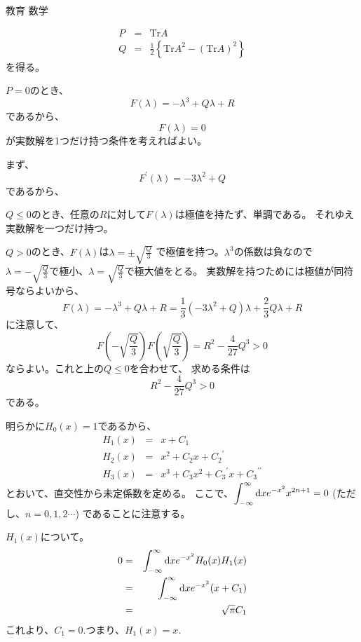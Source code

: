 \documentclass[fleqn]{jbook}
\begin{document}
\begin{answer}{教育 数学}{}
\begin{subanswers}
\begin{subsubanswers}
\begin{eqnarray*}
P &=& \mbox{Tr} A \\
Q &=& \frac{1}{2} \left\{ \mbox{Tr} A^2 - \left( \mbox{Tr} A \right)^2 \right\}
\end{eqnarray*}
を得る。

\SubSubAnswer
$P=0$のとき、
\[F(\lambda) = -\lambda^3 + Q \lambda + R\]
であるから、
\[F(\lambda)=0\]
が実数解を1つだけ持つ条件を考えればよい。

まず、
\[ F^\prime (\lambda) = - 3 \lambda^2 + Q\]
であるから、

$Q \leq 0$のとき、任意の$R$に対して$F(\lambda)$は極値を持たず、単調である。
それゆえ実数解を一つだけ持つ。

$Q>0$のとき、$F(\lambda)$は$\lambda= \pm \displaystyle{\sqrt{\frac{Q}{3}}}$
で極値を持つ。$\lambda^3$の係数は負なので
$\lambda = -\displaystyle{\sqrt{\frac{Q}{3}}}$で極小、$\lambda = 
\displaystyle{\sqrt{\frac{Q}{3}}}$で極大値をとる。
実数解を持つためには極値が同符号ならよいから、
\[F(\lambda) = -\lambda^3 + Q \lambda + R = \frac{1}{3} (-3 \lambda^2 + Q)
\lambda + \frac{2}{3} Q \lambda + R\]
に注意して、
\[ F \left( -\sqrt{\frac{Q}{3}} \right) F \left( \sqrt{\frac{Q}{3}} \right)
= R^2 - \frac{4}{27} Q^3 > 0\]
ならよい。これと上の$Q \leq 0$を合わせて、
求める条件は
\[ R^2 - \frac{4}{27} Q^3 > 0\]
である。
\end{subsubanswers}


\SubAnswer
\begin{subsubanswers}
\SubSubAnswer
明らかに$H_0 (x) = 1$であるから、
\begin{eqnarray*}
H_1 (x) &=& x + C_1 \\
H_2 (x) &=& x^2 + C_2 x + {C_2}^\prime \\
H_3 (x) &=& x^3 + C_3 x^2 + {C_3}^\prime x + {C_3}^{\prime \prime}
\end{eqnarray*}
とおいて、直交性から未定係数を定める。
ここで、$\displaystyle{\int_{-\infty}^{\infty} {\rm d}x e^{- x^2} x^{2n+1} = 0}$
\quad (ただし、$n=0,1,2 \cdots$)
であることに注意する。

$H_1(x)$について。
\begin{eqnarray*}
0 &=& \int_{-\infty}^{\infty} {\rm d}x e^{- x^2} H_0(x) H_1(x) \\
&=& \int_{-\infty}^{\infty} {\rm d}x e^{- x^2} ( x + C_1) \\
&=& \sqrt{\pi} C_1
\end{eqnarray*}
これより、$C_1 = 0.$つまり、$H_1(x) = x.$


\end{subsubanswers}
\end{subanswers}
\end{answer}
\end{document}
